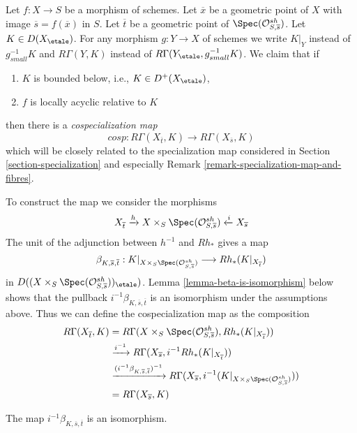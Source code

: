 \noindent
Let $f : X \to S$ be a morphism of schemes. Let $\overline{x}$ be a
geometric point of $X$ with image $\overline{s} = f(\overline{x})$ in $S$.
Let $\overline{t}$ be a geometric point of
$\Spec(\mathcal{O}^{sh}_{S, \overline{s}})$.
Let $K \in D(X_\etale)$. For any morphism $g : Y \to X$ of schemes
we write $K|_Y$ instead of $g_{small}^{-1}K$ and $R\Gamma(Y, K)$
instead of $R\Gamma(Y_\etale, g_{small}^{-1}K)$.
We claim that if
\begin{enumerate}
\item $K$ is bounded below, i.e., $K \in D^+(X_\etale)$,
\item $f$ is locally acyclic relative to $K$
\end{enumerate}
then there is a {\it cospecialization map}
$$
cosp :
R\Gamma(X_{\overline{t}}, K)
\longrightarrow
R\Gamma(X_{\overline{s}}, K)
$$
which will be closely related to the specialization map
considered in Section \ref{section-specialization} and especially
Remark \ref{remark-specialization-map-and-fibres}.

\medskip\noindent
To construct the map we consider the morphisms
$$
X_{\overline{t}}
\xrightarrow{h}
X \times_S \Spec(\mathcal{O}^{sh}_{S, \overline{s}})
\xleftarrow{i}
X_{\overline{s}}
$$
The unit of the adjunction between $h^{-1}$ and $Rh_*$ gives a map
$$
\beta_{K, \overline{s}, \overline{t}} :
K|_{X \times_S \Spec(\mathcal{O}^{sh}_{S, \overline{s}})}
\longrightarrow
Rh_*(K|_{X_{\overline{t}}})
$$
in $D((X \times_S \Spec(\mathcal{O}^{sh}_{S, \overline{s}}))_\etale)$.
Lemma \ref{lemma-beta-is-isomorphism} below shows that the pullback
$i^{-1}\beta_{K, \overline{s}, \overline{t}}$
is an isomorphism under the assumptions above.
Thus we can define the cospecialization map as the composition
\begin{align*}
R\Gamma(X_{\overline{t}}, K)
& =
R\Gamma(X \times_S \Spec(\mathcal{O}^{sh}_{S, \overline{s}}),
Rh_*(K|_{X_{\overline{t}}})) \\
&
\xrightarrow{i^{-1}}
R\Gamma(X_{\overline{s}}, i^{-1}Rh_*(K|_{X_{\overline{t}}})) \\
&
\xrightarrow{(i^{-1}\beta_{K, \overline{s}, \overline{t}})^{-1}}
R\Gamma(X_{\overline{s}},
i^{-1}(K|_{X \times_S \Spec(\mathcal{O}^{sh}_{S, \overline{s}})})) \\
& =
R\Gamma(X_{\overline{s}}, K)
\end{align*}

\begin{lemma}
\label{lemma-beta-is-isomorphism}
The map $i^{-1}\beta_{K, \overline{s}, \overline{t}}$ is an isomorphism.
\end{lemma}

